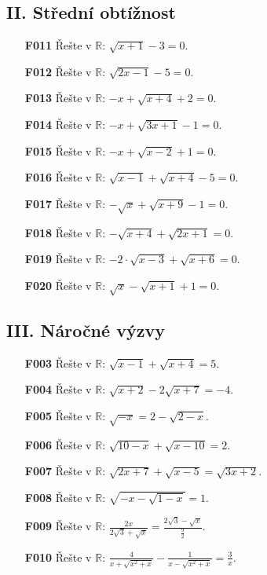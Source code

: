 \documentclass[11pt,a4paper]{article}
\begin{document}
\subsection*{II. Střední obtížnost}
\begin{enumerate}[label={},itemsep=5pt]
\item[\textbf{F011}] Řešte v $\mathbb R$: $\sqrt{x + 1} - 3=0$.
\item[\textbf{F012}] Řešte v $\mathbb R$: $\sqrt{2x - 1} - 5=0$.
\item[\textbf{F013}] Řešte v $\mathbb R$: $- x + \sqrt{x + 4} + 2=0$.
\item[\textbf{F014}] Řešte v $\mathbb R$: $- x + \sqrt{3x + 1} - 1=0$.
\item[\textbf{F015}] Řešte v $\mathbb R$: $- x + \sqrt{x - 2} + 1=0$.
\item[\textbf{F016}] Řešte v $\mathbb R$: $\sqrt{x - 1} + \sqrt{x + 4} - 5=0$.
\item[\textbf{F017}] Řešte v $\mathbb R$: $- \sqrt{x} + \sqrt{x + 9} - 1=0$.
\item[\textbf{F018}] Řešte v $\mathbb R$: $- \sqrt{x + 4} + \sqrt{2x + 1}=0$.
\item[\textbf{F019}] Řešte v $\mathbb R$: $- 2 \cdot \sqrt{x - 3} + \sqrt{x + 6}=0$.
\item[\textbf{F020}] Řešte v $\mathbb R$: $\sqrt{x} - \sqrt{x + 1} + 1=0$.
\end{enumerate}
\subsection*{III. Náročné výzvy}
\begin{enumerate}[label={},itemsep=5pt]
\item[\textbf{F003}] Řešte v $\mathbb R$: $\sqrt{x-1}+\sqrt{x+4}=5$. 
\item[\textbf{F004}] Řešte v $\mathbb R$: $\sqrt{x+2}-2\sqrt{x+7}=-4$. 
\item[\textbf{F005}] Řešte v $\mathbb R$: $\sqrt{-x}=2-\sqrt{2-x}$. 
\item[\textbf{F006}] Řešte v $\mathbb R$: $\sqrt{10-x}+\sqrt{x-10}=2$. 
\item[\textbf{F007}] Řešte v $\mathbb R$: $\sqrt{2x+7}+\sqrt{x-5}=\sqrt{3x+2}$. 
\item[\textbf{F008}] Řešte v $\mathbb R$: $\sqrt{-x-\sqrt{1-x}}=1$. 
\item[\textbf{F009}] Řešte v $\mathbb R$: $\frac{2x}{2\sqrt3+\sqrt{x}}=\frac{2\sqrt3-\sqrt{x}}{\frac92}$. 
\item[\textbf{F010}] Řešte v $\mathbb R$: $\frac4{x+\sqrt{x^2+x}}-\frac1{x-\sqrt{x^2+x}}=\frac3x$. 
\end{enumerate}
\end{document}
